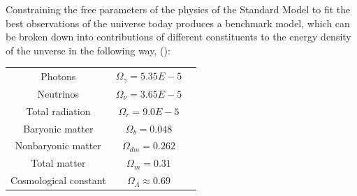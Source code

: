 \documentclass{paper}
\begin{document}
  Constraining the free parameters of the physics of the Standard Model to
  fit the best observations of the universe today produces a benchmark model,
  which can be broken down into contributions of different 
  constituents to the energy density of the unverse in the following way,
  (\cite{ryden2003introduction}):

  \begin{center}
  \begin{tabular}{ c c c }
    Photons & \(\Omega_{\gamma} = 5.35E-5 \) \\
    Neutrinos & \(\Omega_{\nu} = 3.65E-5 \) \\
    Total radiation & \(\Omega_{r} = 9.0E-5 \) \\
    Baryonic matter & \(\Omega_{b} = 0.048 \) \\
    Nonbaryonic matter & \(\Omega_{dm} = 0.262 \) \\
    Total matter & \(\Omega_{m} = 0.31 \) \\
    Cosmological constant & \(\Omega_{\Lambda} \approx 0.69 \)
 \end{tabular}
 \end{center}


\pagebreak
\begin{singlespace}
\printbibliography
\end{singlespace}

\end{document}
